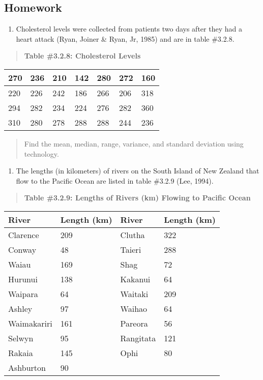 \documentclass[]{book}
\providecommand{\tightlist}{%
  \setlength{\itemsep}{0pt}\setlength{\parskip}{0pt}}
\begin{document}
\hypertarget{homework-8}{%
\subsection{Homework}\label{homework-8}}

\begin{enumerate}
\def\labelenumi{\arabic{enumi}.}
\tightlist
\item
  Cholesterol levels were collected from patients two days after they
  had a heart attack (Ryan, Joiner \& Ryan, Jr, 1985) and are in table
  \#3.2.8.
\end{enumerate}

\begin{quote}
\textbf{Table \#3.2.8: Cholesterol Levels}
\end{quote}

\begin{longtable}[]{@{}lllllll@{}}
\toprule
270 & 236 & 210 & 142 & 280 & 272 & 160\tabularnewline
\midrule
\endhead
220 & 226 & 242 & 186 & 266 & 206 & 318\tabularnewline
294 & 282 & 234 & 224 & 276 & 282 & 360\tabularnewline
310 & 280 & 278 & 288 & 288 & 244 & 236\tabularnewline
\bottomrule
\end{longtable}

\begin{quote}
Find the mean, median, range, variance, and standard deviation using
technology.
\end{quote}

\begin{enumerate}
\def\labelenumi{\arabic{enumi}.}
\setcounter{enumi}{1}
\tightlist
\item
  The lengths (in kilometers) of rivers on the South Island of New
  Zealand that flow to the Pacific Ocean are listed in table \#3.2.9
  (Lee, 1994).
\end{enumerate}

\begin{quote}
\textbf{Table \#3.2.9: Lengths of Rivers (km) Flowing to Pacific Ocean}
\end{quote}

\begin{longtable}[]{@{}llll@{}}
\toprule
River & Length (km) & River & Length (km)\tabularnewline
\midrule
\endhead
Clarence & 209 & Clutha & 322\tabularnewline
Conway & 48 & Taieri & 288\tabularnewline
Waiau & 169 & Shag & 72\tabularnewline
Hurunui & 138 & Kakanui & 64\tabularnewline
Waipara & 64 & Waitaki & 209\tabularnewline
Ashley & 97 & Waihao & 64\tabularnewline
Waimakariri & 161 & Pareora & 56\tabularnewline
Selwyn & 95 & Rangitata & 121\tabularnewline
Rakaia & 145 & Ophi & 80\tabularnewline
Ashburton & 90 & &\tabularnewline
\bottomrule
\end{longtable}
\end{document}
